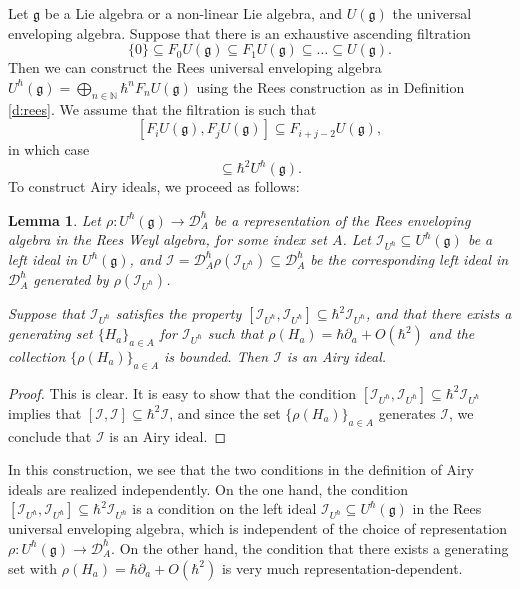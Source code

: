 \documentclass[reqno,oneside,11pt]{amsart}
\theoremstyle{plain}
\newtheorem{lemma}[theorem]{Lemma}
\theoremstyle{definition}
\theoremstyle{remark}
\numberwithin{equation}{section}
\newcommand{\DAh}{\mathcal{D}_A^{\hbar}}
\begin{document}
Let $\mathfrak{g}$ be a Lie algebra or a non-linear Lie algebra, and $U(\mathfrak{g})$ the universal enveloping algebra. Suppose that there is an exhaustive ascending filtration 
\begin{equation}
\{0\} \subseteq F_0 U(\mathfrak{g}) \subseteq F_1 U(\mathfrak{g}) \subseteq \ldots \subseteq U(\mathfrak{g}).
\end{equation}
Then we can construct the Rees universal enveloping algebra $U^\hbar(\mathfrak{g}) = \bigoplus_{n \in \mathbb{N}} \hbar^n F_n U(\mathfrak{g})$ using the Rees construction as in Definition \ref{d:rees}. We assume that the filtration is such that
\begin{equation}\label{eq:filtcond}
[ F_i U(\mathfrak{g}), F_j U(\mathfrak{g})] \subseteq F_{i+j-2} U(\mathfrak{g}),
\end{equation}
in which case
\begin{equation}
[U^\hbar(\mathfrak{g}), U^\hbar(\mathfrak{g})] \subseteq \hbar^2 U^\hbar(\mathfrak{g}).
\end{equation}
To construct Airy ideals, we proceed as follows:
\begin{lemma}\label{l:uea}
Let $\rho: U^\hbar(\mathfrak{g}) \to \DAh$ be a representation of the Rees enveloping algebra in the Rees Weyl algebra, for some index set $A$. Let $\mathcal{I}_{U^\hbar} \subseteq U^\hbar(\mathfrak{g})$ be a left ideal in $U^\hbar(\mathfrak{g})$, and $\mathcal{I} = \DAh \rho(\mathcal{I}_{U^\hbar}) \subseteq \DAh$ be the corresponding left ideal in $\DAh$ generated by $\rho(\mathcal{I}_{U^\hbar})$.

Suppose that  $\mathcal{I}_{U^\hbar}$ satisfies the property $[\mathcal{I}_{U^\hbar},\mathcal{I}_{U^\hbar}] \subseteq \hbar^2 \mathcal{I}_{U^\hbar}$, and that there exists a generating set $\{H_a \}_{a \in A}$ for $\mathcal{I}_{U^\hbar}$ such that $\rho(H_a) = \hbar \partial_a + O(\hbar^2)$ and the collection $\{\rho(H_a)\}_{a \in A}$ is bounded. Then $\mathcal{I}$ is an Airy ideal.
\end{lemma}

\begin{proof}
This is clear. It is easy to show that the condition $[\mathcal{I}_{U^\hbar},\mathcal{I}_{U^\hbar}] \subseteq \hbar^2 \mathcal{I}_{U^\hbar}$ implies that $[\mathcal{I}, \mathcal{I} ] \subseteq \hbar^2 \mathcal{I}$, and since the set $\{ \rho(H_a) \}_{a \in A}$ generates $\mathcal{I}$, we conclude that $\mathcal{I}$ is an Airy ideal.
\end{proof}

In this construction, we see that the two conditions in the definition of Airy ideals are realized independently. On the one hand, the condition $[\mathcal{I}_{U^\hbar},\mathcal{I}_{U^\hbar}] \subseteq \hbar^2 \mathcal{I}_{U^\hbar}$ is a condition on the left ideal $\mathcal{I}_{U^\hbar} \subseteq U^\hbar(\mathfrak{g})$ in the Rees universal enveloping algebra, which is independent of the choice of representation $\rho: U^\hbar(\mathfrak{g}) \to \DAh$. On the other hand, the condition that there exists a generating set with $\rho(H_a) = \hbar \partial_a  + O(\hbar^2)$ is very much representation-dependent.
\end{document}
